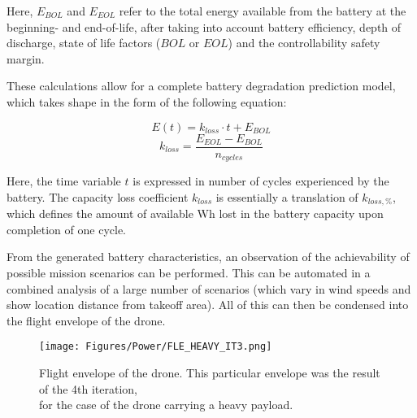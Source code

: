 Here, $E_{\mathit{BOL}}$ and $E_{\mathit{EOL}}$ refer to the total energy available from the battery at the beginning- and end-of-life, after taking into account battery efficiency, depth of discharge, state of life factors ($BOL$ or $EOL$) and the controllability safety margin.

These calculations allow for a complete battery degradation prediction model, which takes shape in the form of the following equation:

\begin{multicols}{2}
\noindent
    \begin{equation}
    E(t) = k_{\mathit{loss}} \cdot t + E_{\mathit{BOL}}
    \label{eq:E_of_t}
    \end{equation}
    \begin{equation}
    k_{\mathit{loss}} = \frac{E_{\mathit{EOL}} - E_{\mathit{BOL}}}{n_{\mathit{cycles}}}
    \label{eq:kloss}
    \end{equation}
\end{multicols}

Here, the time variable $t$ is expressed in number of cycles experienced by the battery. The capacity loss coefficient $k_{\mathit{loss}}$ is essentially a translation of $k_{loss,\%}$, which defines the amount of available Wh lost in the battery capacity upon completion of one cycle.

From the generated battery characteristics, an observation of the achievability of possible mission scenarios can be performed. This can be automated in a combined analysis of a large number of scenarios (which vary in wind speeds and show location distance from takeoff area). All of this can then be condensed into the flight envelope of the drone.

\begin{figure}[H]
    \centering
    \texttt{[image: Figures/Power/FLE\_HEAVY\_IT3.png]}
    \caption{Flight envelope of the drone. This particular envelope was the result of the 4th iteration,\\ for the case of the drone carrying a heavy payload.}
    \label{fig:FLE_HEAVY_IT3}
\end{figure}

